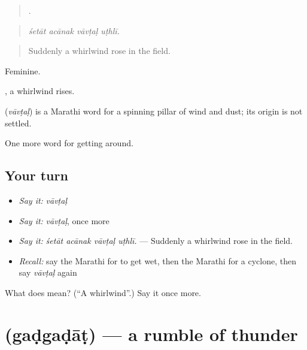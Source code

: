 \begin{quote}
   .
\end{quote}

\begin{quote}
\emph{śetāt acānak vāvṭaḷ uṭhlī.}
\end{quote}

\begin{quote}
Suddenly a whirlwind rose in the field.
\end{quote}

Feminine.

 , a whirlwind rises.

\begin{cousinweb}
\textbf{} (\emph{vāvṭaḷ}) is a Marathi word for a spinning pillar of wind and dust; its origin is not settled.
\end{cousinweb}

\begin{grammarlens}[title={What you've built}]
One more word for getting around.
\end{grammarlens}

\subsection*{Your turn}
\begin{itemize}
\raggedright
  \item \emph{Say it:} \emph{vāvṭaḷ}
  \item \emph{Say it:} \emph{vāvṭaḷ}, once more
  \item \emph{Say it:} \emph{śetāt acānak vāvṭaḷ uṭhlī.} — Suddenly a whirlwind rose in the field.
  \item \emph{Recall:} say the Marathi for to get wet, then the Marathi for a cyclone, then say \emph{vāvṭaḷ} again
\end{itemize}

\begin{tcolorbox}[breakable,colback=teal!4,colframe=teal!35!black,title={Before you move on}]
What does  mean? (\textquotedblleft{}A whirlwind\textquotedblright{}.) Say it once more.
\end{tcolorbox}
\section[\texorpdfstring{\mr{गडगडाट} (gaḍgaḍāṭ)}{गडगडाट (gaḍgaḍāṭ)}]{ (gaḍgaḍāṭ) — a rumble of thunder}

